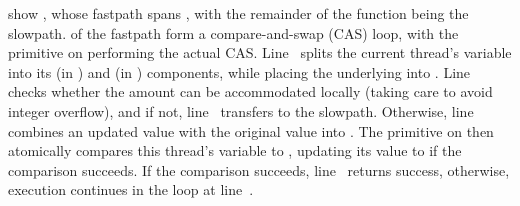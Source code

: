 \begin{fcvref}
 show , whose fastpath spans
,
with the remainder of the function being the slowpath.
 of the fastpath form a compare-and-swap
(CAS) loop, with
the  primitive on
 performing the
actual CAS\@.
Line~ splits the current thread's  variable into its
 (in ) and  (in ) components,
while placing the underlying  into .
Line~ checks whether the amount  can be accommodated
locally (taking care to avoid integer overflow), and if not,
line~ transfers to the slowpath.
Otherwise, line~ combines an updated  value with the
original  value into .
The  primitive on
 then atomically
compares this thread's  variable to ,
updating its value to  if the comparison succeeds.
If the comparison succeeds, line~ returns success, otherwise,
execution continues in the loop at line~.
\end{fcvref}

\fi

